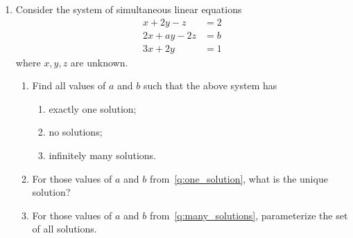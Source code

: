 \documentclass{article}
\begin{document}
\begin{enumerate}
\item 

Consider the system of simultaneous linear equations
\begin{align*}
  x + 2y -  z &= 2 \\
 2x + ay - 2z &= b \\
 3x + 2y      &= 1
\end{align*}
where $x, y, z$ are unknown.

\begin{enumerate}
\item Find all values of $a$ and $b$ such that the above system has
\begin{enumerate}
\item \label{q:one_solution} exactly one solution;
\item no solutions;
\item \label{q:many_solutions} infinitely many solutions.
\end{enumerate}
\item For those values of $a$ and $b$ from~\ref{q:one_solution}, what is the
unique solution?
\item For those values of $a$ and $b$ from~\ref{q:many_solutions},
 parameterize the set of all solutions.
\end{enumerate}



\end{enumerate}
\end{document}
